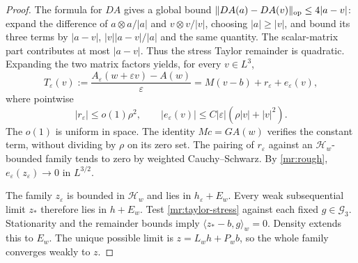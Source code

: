 \begin{proof}
The formula for $DA$ gives a global bound
$\|DA(a)-DA(v)\|_{\rm op}\le4|a-v|$: expand the difference of
$a\otimes a/|a|$ and $v\otimes v/|v|$, choosing $|a|\ge|v|$, and
bound its three terms by $|a-v|$, $|v||a-v|/|a|$ and the same quantity.
The scalar-matrix part contributes at most $|a-v|$.
Thus the stress Taylor remainder is quadratic. Expanding the two matrix
factors yields, for every $v\in L^3$,
\begin{equation}\label{mr:taylor-stress}
 T_\varepsilon(v):=\frac{A_\varepsilon(w+\varepsilon v)-A(w)}{\varepsilon}
       =M(v-b)+r_\varepsilon+e_\varepsilon(v),
\end{equation}
where pointwise
\[
 |r_\varepsilon|\le o(1)\rho^2,
 \qquad |e_\varepsilon(v)|
       \le C|\varepsilon|(\rho|v|+|v|^2).
\]
The $o(1)$ is uniform in space. The identity $Mc=GA(w)$ verifies the
constant term, without dividing by $\rho$ on its zero set.
The pairing of $r_\varepsilon$ against an $\mathcal H_w$-bounded family
tends to zero by weighted Cauchy--Schwarz. By \eqref{mr:rough},
$e_\varepsilon(z_\varepsilon)\to0$ in $L^{3/2}$.

The family $z_\varepsilon$ is bounded in $\mathcal H_w$ and lies in
$h_\varepsilon+E_w$. Every weak subsequential limit $z_*$ therefore
lies in $h+E_w$. Test \eqref{mr:taylor-stress} against each fixed
$g\in\mathcal G_3$. Stationarity and the remainder bounds imply
$\langle z_*-b,g\rangle_w=0$. Density extends this to $E_w$.
The unique possible limit is $z=L_wh+P_wb$, so the whole family converges
weakly to $z$.


\end{proof}
